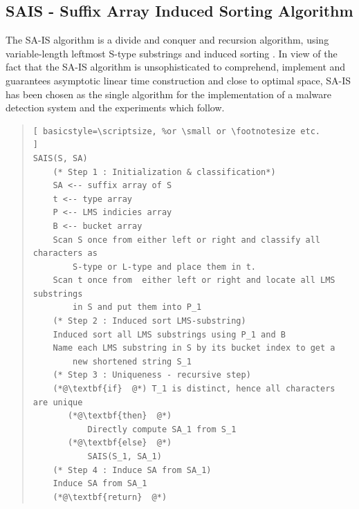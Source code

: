 \documentclass[12pt]{article} %
\begin{document}
\subsection{SAIS - Suffix Array Induced Sorting Algorithm} \label{SAIS Section}

The SA-IS algorithm  is a divide and conquer and recursion algorithm, using variable-length leftmost S-type substrings and induced sorting \cite{twoeffecient}. In view of the fact that the SA-IS algorithm is unsophisticated to comprehend, implement and guarantees asymptotic linear time construction and close to optimal space,  SA-IS has been chosen as the single algorithm for the implementation of a malware detection system and the experiments which follow. 

\begin{quote}
\begin{lstlisting}[ basicstyle=\scriptsize, %or \small or \footnotesize etc.
]
SAIS(S, SA)
    (* Step 1 : Initialization & classification*)
    SA <-- suffix array of S
    t <-- type array
    P <-- LMS indicies array
    B <-- bucket array
    Scan S once from either left or right and classify all characters as 
        S-type or L-type and place them in t.
    Scan t once from  either left or right and locate all LMS substrings 
        in S and put them into P_1
    (* Step 2 : Induced sort LMS-substring)
    Induced sort all LMS substrings using P_1 and B
    Name each LMS substring in S by its bucket index to get a 
        new shortened string S_1
    (* Step 3 : Uniqueness - recursive step)
    (*@\textbf{if}  @*) T_1 is distinct, hence all characters are unique
       (*@\textbf{then}  @*) 
           Directly compute SA_1 from S_1
       (*@\textbf{else}  @*) 
           SAIS(S_1, SA_1)
    (* Step 4 : Induce SA from SA_1)
    Induce SA from SA_1       
    (*@\textbf{return}  @*) 
\end{lstlisting}
\end{quote}
\end{document}
